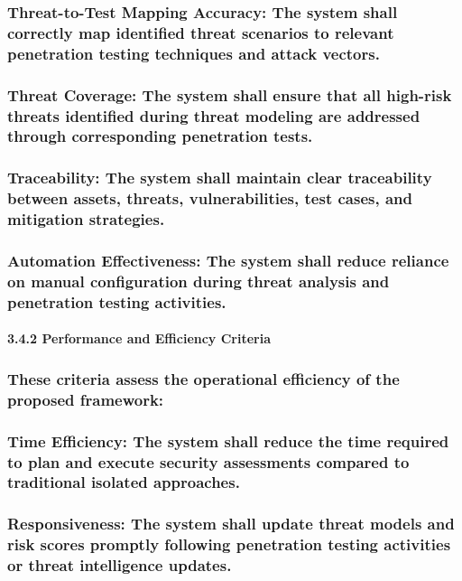 \documentclass[12pt,a4paper]{report}
\begin{document}
\subsubsection{Threat-to-Test Mapping Accuracy: The system shall correctly map identified threat scenarios to relevant penetration testing techniques and attack vectors.}

\subsubsection{Threat Coverage: The system shall ensure that all high-risk threats identified during threat modeling are addressed through corresponding penetration tests.}

\subsubsection{Traceability: The system shall maintain clear traceability between assets, threats, vulnerabilities, test cases, and mitigation strategies.}

\subsubsection{Automation Effectiveness: The system shall reduce reliance on manual configuration during threat analysis and penetration testing activities.}

\paragraph{3.4.2 Performance and Efficiency Criteria}

\subsubsection{These criteria assess the operational efficiency of the proposed framework:}

\subsubsection{Time Efficiency: The system shall reduce the time required to plan and execute security assessments compared to traditional isolated approaches.}

\subsubsection{Responsiveness: The system shall update threat models and risk scores promptly following penetration testing activities or threat intelligence updates.}
\end{document}
